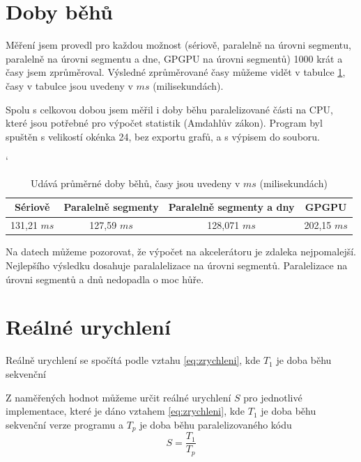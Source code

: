 \documentclass{article}
\begin{document}
	\section{Doby běhů}
	Měření jsem provedl pro každou možnost (sériově, paralelně na úrovni segmentu, paralelně na úrovni segmentu a dne, GPGPU na úrovni segmentů) 1000 krát a časy jsem zprůměroval.
	Výsledné zprůměrované časy můžeme vidět v tabulce \ref{tab:runtime}, časy v tabulce jsou uvedeny v $m s$ (milisekundách).
	\par Spolu s celkovou dobou jsem měřil i doby běhu paralelizované části na CPU, které jsou potřebné pro výpočet statistik (Amdahlův zákon). Program byl spuštěn s velikostí okénka 24, bez exportu grafů, a s výpisem do souboru.
	
	
	\begin{table}[h]
	\centering
	\catcode`
	\def\arraystretch{1.2}
	\begin{tabular}{|c|c|c|c|}
	\hline
	\textbf{Sériově} & \textbf{Paralelně segmenty} &  \textbf{Paralelně segmenty a dny} & \textbf{GPGPU}  \\ \hline
	\hline
	131,21 $m s$    		  & 127,59 $m s$                  & 128,071 $m s$     		  &        202,15 $m s$                   \\ \hline
	
	\end{tabular}
	\caption{Udává průměrné doby běhů, časy jsou uvedeny v $m s$ (milisekundách)}
	\label{tab:runtime}
	\end{table}
	
	
	Na datech můžeme pozorovat, že výpočet na akcelerátoru je zdaleka nejpomalejší. Nejlepšího výsledku dosahuje paralalelizace na úrovni segmentů. Paralelizace na úrovni segmentů a dnů nedopadla o moc hůře. 
	
	\section{Reálné urychlení}
	Reálně urychlení se spočítá podle vztahu \ref{eq:zrychleni}, kde $T_{1}$ je doba běhu sekvenční 
	\par  Z naměřených hodnot můžeme určit reálné urychlení $S$ pro jednotlivé implementace, které je dáno vztahem \ref{eq:zrychleni}, kde $T_{1}$ je doba běhu sekvenční verze programu a $T_{p}$ je doba běhu paralelizovaného kódu
	\begin{equation} 
	S=\frac{T_{1}}{T_{p}}
	\label{eq:zrychleni}
	\end{equation}
	
\end{document}

